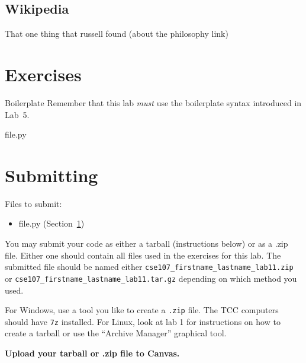 \documentclass[11pt]{cselabheader}
\begin{document}
\subsection{Wikipedia}

That one thing that russell found (about the philosophy link)

\pagebreak
\section{Exercises}
\label{sec:ex}


\begin{warningbox}{Boilerplate}
  Remember that this lab \emph{must} use the
  boilerplate syntax introduced in Lab~5.
\end{warningbox}

\begin{description}
  \item[file.py]
\end{description}

\pagebreak
\section{Submitting}

Files to submit:
\begin{itemize}
\item file.py (Section~\ref{sec:ex})
\end{itemize}

You may submit your code as either a tarball (instructions below) or as a .zip
file. Either one should contain all files used in the exercises for this lab.
The submitted file should be named either
\texttt{cse107\_firstname\_lastname\_lab11.zip} or
\texttt{cse107\_firstname\_lastname\_lab11.tar.gz} depending on which method you
used.

For Windows, use a tool you like to create a \texttt{.zip} file. The TCC
computers should have \texttt{7z} installed. For Linux, look at lab 1 for
instructions on how to create a tarball or use the ``Archive Manager'' graphical
tool.

\begin{center}
  \textbf{Upload your tarball or .zip file to Canvas.}
\end{center}
\end{document}
